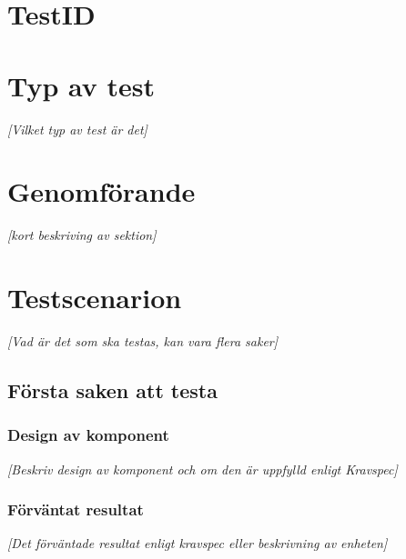 \documentclass[a4paper,10pt, twoside]{article}
\begin{document}
\section{TestID}
\section{Typ av test}
\emph{[Vilket typ av test är det]}
\section{Genomförande}
\emph{[kort beskriving av sektion]}
\section{Testscenarion}
\emph{[Vad är det som ska testas, kan vara flera saker]}
\subsection{Första saken att testa}
\subsubsection{Design av komponent}
\emph{[Beskriv design av komponent och om den är uppfylld enligt Kravspec]}
\subsubsection{Förväntat resultat}
\emph{[Det förväntade resultat enligt kravspec eller beskrivning av enheten]}
\end{document}
